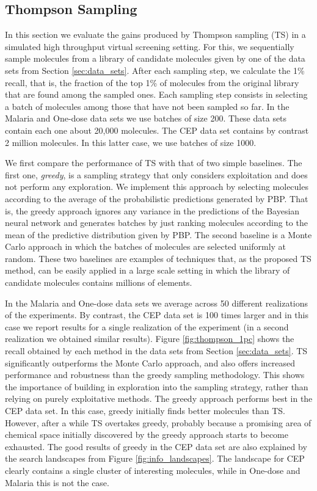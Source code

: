 \subsection{Thompson Sampling}

In this section we evaluate the gains produced by Thompson sampling (TS) in a simulated high throughput virtual screening setting. For this, we sequentially sample molecules from a library of candidate molecules given by one of the data sets from Section \ref{sec:data_sets}. After each sampling step, we calculate the 1\% recall, that is, the fraction of the top 1\% of molecules from the original library that are found among the sampled ones. Each sampling step consists in selecting a batch of molecules among those that have not been sampled so far. In the Malaria and One-dose data sets we use batches of size 200. These data sets contain each one about 20,000 molecules. The CEP data set contains by contrast 2 million molecules. In this latter case, we use batches of size 1000. 

We first compare the performance of TS with that of two simple baselines. The first one, \emph{greedy}, is a sampling strategy that only considers exploitation and does not perform any exploration. We implement this approach by selecting molecules according to the average of the probabilistic predictions generated by PBP. That is, the greedy approach ignores any variance in the predictions of the Bayesian neural network and generates batches by just ranking molecules according to the mean of the predictive distribution given by PBP. The second baseline is a Monte Carlo approach in which the batches of molecules are selected uniformly at random. These two baselines are examples of techniques that, as the proposed TS method, can be easily applied in a large scale setting in which the library of candidate molecules contains millions of elements.

In the Malaria and One-dose data sets we average across 50 different realizations of the experiments. By contrast, the CEP data set is 100 times larger and in this case we report results for a single realization of the experiment (in a second realization we obtained similar results). 
Figure \ref{fig:thompson_1pc} shows the recall obtained by each method in the data sets from 
Section \ref{sec:data_sets}. TS significantly outperforms the Monte Carlo approach, and also offers increased performance and robustness than the greedy sampling methodology. This shows the importance of building in exploration into the sampling strategy, rather than relying on purely exploitative methods. The greedy approach performs best in the CEP data set. In this case, greedy initially finds better molecules than TS. However, after a while TS overtakes greedy, probably because a promising area of chemical space 
initially discovered by the greedy approach starts to become exhausted. The good results of greedy in the CEP data set are also explained by the search landscapes from Figure \ref{fig:info_landscapes}. The landscape for CEP clearly contains a single cluster of interesting molecules, while in One-dose and Malaria this is not the case.

